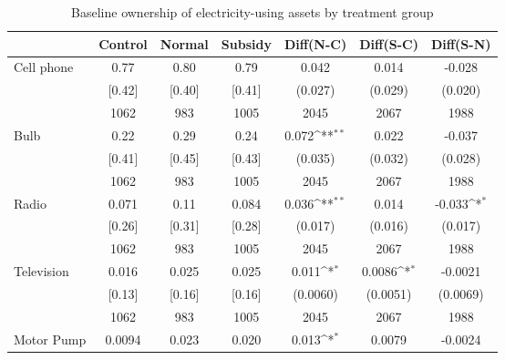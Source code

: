 \begin{table}[htbp]\centering
\def\sym#1{\ifmmode^{#1}\else\(^{#1}\)\fi}
\caption{Baseline ownership of electricity-using assets by treatment group \label{tab:"balance"}}
\begin{tabular*}{1\hsize}{@{\hskip\tabcolsep\extracolsep\fill}l*{1}{cccccc}}
\toprule
                                &  Control&   Normal&  Subsidy&Diff(N-C)         &Diff(S-C)         &Diff(S-N)         \\
\midrule
Cell phone                      &     0.77&     0.80&     0.79&    0.042         &    0.014         &   -0.028         \\
                                &   [0.42]&   [0.40]&   [0.41]&  (0.027)         &  (0.029)         &  (0.020)         \\
                                &     1062&      983&     1005&     2045         &     2067         &     1988         \\
Bulb                            &     0.22&     0.29&     0.24&    0.072\sym{**} &    0.022         &   -0.037         \\
                                &   [0.41]&   [0.45]&   [0.43]&  (0.035)         &  (0.032)         &  (0.028)         \\
                                &     1062&      983&     1005&     2045         &     2067         &     1988         \\
Radio                           &    0.071&     0.11&    0.084&    0.036\sym{**} &    0.014         &   -0.033\sym{*}  \\
                                &   [0.26]&   [0.31]&   [0.28]&  (0.017)         &  (0.016)         &  (0.017)         \\
                                &     1062&      983&     1005&     2045         &     2067         &     1988         \\
Television                      &    0.016&    0.025&    0.025&    0.011\sym{*}  &   0.0086\sym{*}  &  -0.0021         \\
                                &   [0.13]&   [0.16]&   [0.16]& (0.0060)         & (0.0051)         & (0.0069)         \\
                                &     1062&      983&     1005&     2045         &     2067         &     1988         \\
Motor Pump                      &   0.0094&    0.023&    0.020&    0.013\sym{*}  &   0.0079         &  -0.0024         \\

\end{tabular*}
\end{table}
